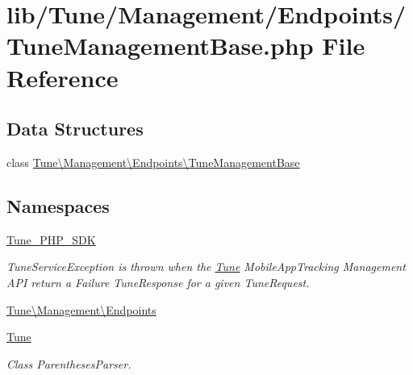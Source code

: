 \hypertarget{TuneManagementBase_8php}{\section{lib/\-Tune/\-Management/\-Endpoints/\-Tune\-Management\-Base.php File Reference}
\label{TuneManagementBase_8php}
}
\subsection*{Data Structures}
\begin{DoxyCompactItemize}
\item 
class \hyperlink{classTune_1_1Management_1_1Endpoints_1_1TuneManagementBase}{Tune\textbackslash{}\-Management\textbackslash{}\-Endpoints\textbackslash{}\-Tune\-Management\-Base}
\end{DoxyCompactItemize}
\subsection*{Namespaces}
\begin{DoxyCompactItemize}
\item 
\hyperlink{namespaceTune__PHP__SDK}{Tune\-\_\-\-P\-H\-P\-\_\-\-S\-D\-K}
\begin{DoxyCompactList}\small\item\em Tune\-Service\-Exception is thrown when the \hyperlink{namespaceTune}{Tune} Mobile\-App\-Tracking Management A\-P\-I return a Failure Tune\-Response for a given Tune\-Request. \end{DoxyCompactList}\item 
\hyperlink{namespaceTune_1_1Management_1_1Endpoints}{Tune\textbackslash{}\-Management\textbackslash{}\-Endpoints}
\item 
\hyperlink{namespaceTune}{Tune}
\begin{DoxyCompactList}\small\item\em Class Parentheses\-Parser. \end{DoxyCompactList}\end{DoxyCompactItemize}
